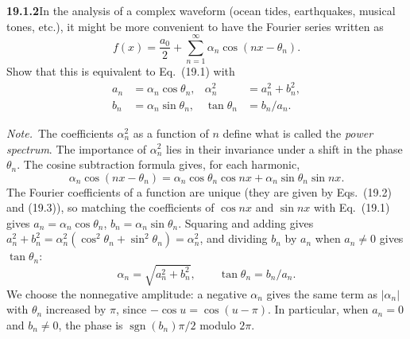 \par\bigskip
\noindent\textbf{19.1.2}\quad In the analysis of a complex waveform
(ocean tides, earthquakes, musical tones, etc.), it might be more
convenient to have the Fourier series written as
\[
f(x)=\frac{a_{0}}{2}+\sum_{n=1}^{\infty}
\alpha_{n}\cos(nx-\theta_{n}).
\]
Show that this is equivalent to Eq.~(19.1) with
\begin{align*}
a_{n}&=\alpha_{n}\cos\theta_{n},&
\alpha_{n}^{2}&=a_{n}^{2}+b_{n}^{2},\\
b_{n}&=\alpha_{n}\sin\theta_{n},&
\tan\theta_{n}&=b_{n}/a_{n}.
\end{align*}
\par\emph{Note.}~The coefficients $\alpha_{n}^{2}$ as a function of
$n$ define what is called the \emph{power spectrum}. The importance
of $\alpha_{n}^{2}$ lies in their invariance under a shift in the
phase $\theta_{n}$.
\solution
The cosine subtraction formula gives, for each harmonic,
\[
\alpha_n\cos(nx-\theta_n)
=\alpha_n\cos\theta_n\cos nx+\alpha_n\sin\theta_n\sin nx.
\]
The Fourier coefficients of a function are unique (they are given by
Eqs.~(19.2) and (19.3)), so matching the coefficients of $\cos nx$ and
$\sin nx$ with Eq.~(19.1) gives
$a_n=\alpha_n\cos\theta_n$, $b_n=\alpha_n\sin\theta_n$.
Squaring and adding gives
$a_n^2+b_n^2=\alpha_n^2(\cos^2\theta_n+\sin^2\theta_n)=\alpha_n^2$,
and dividing $b_n$ by $a_n$ when $a_n\ne0$ gives $\tan\theta_n$:
\[
\boxed{\alpha_n=\sqrt{a_n^2+b_n^2},\qquad
\tan\theta_n=b_n/a_n.}
\]
We choose the nonnegative amplitude: a negative $\alpha_n$ gives the
same term as $|\alpha_n|$ with $\theta_n$ increased by $\pi$, since
$-\cos u=\cos(u-\pi)$. 
In particular, when $a_n=0$ and $b_n\ne0$, the phase is
$\operatorname{sgn}(b_n)\pi/2$ modulo $2\pi$.

